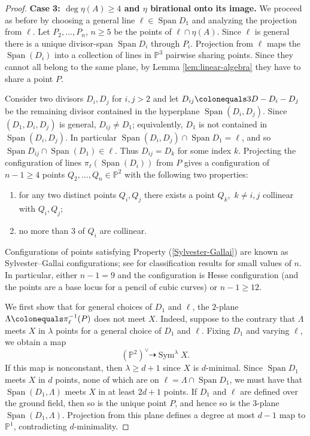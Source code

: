 \documentclass[11pt]{amsart}
\newcommand{\PP}{\mathbb{P}}
\newcommand{\pp}{\mathbb{P}}
\DeclareMathOperator{\Sym}{Sym}
\newcommand{\Span}{\operatorname{Span}}
\theoremstyle{definition}
\theoremstyle{remark}
\begin{document}
\begin{proof}
\noindent
\textbf{\boldmath Case 3: \(\deg \eta(A) \geqslant 4\) and \(\eta\) birational onto its image.} 
We proceed as before by choosing a general line $\ell \in \Span D_1$ and analyzing the projection from $\ell$. 
    Let $P_2, ..., P_n$, $n \geqslant 5$ be the points of $\ell \cap \eta(A)$. Since $\ell$ is general there is a unique divisor-span $\Span D_i$ through $P_i$. Projection from $\ell$ maps the $\Span(D_i)$ into a collection of lines in $\PP^3$ pairwise sharing points.  Since they cannot all belong to the same plane, by Lemma \ref{lem:linear-algebra} they have to share a point $P$. 
        
        Consider two divisors $D_i, D_j$ for $i,j>2$ and let $D_{ij}\colonequals 3D-D_i-D_j$ be the remaining divisor contained in the hyperplane $\Span(D_i, D_j)$.  Since \((D_1, D_i, D_j)\) is general, \(D_{ij} \neq D_1\); equivalently, \(D_1\) is not contained in $\Span(D_i, D_j)$.  In particular \(\Span(D_i, D_j) \cap \Span D_1 = \ell\), and so \(\Span D_{ij}\cap\Span(D_1) \in \ell\).  Thus $D_{ij}=D_k$ for some index $k$.   Projecting the configuration of lines $\pi_\ell(\Span(D_i))$ from $P$ gives a configuration of $n-1 \geqslant 4$ points $Q_2, ..., Q_n \in \PP^2$ with the following two properties:
        \begin{enumerate}
            \item\label{Sylvester-Gallai} for any two distinct points $Q_i, Q_j$ there exists a point $Q_k,$ $k \neq i,j$ collinear with $Q_i, Q_j$;
            \item no more than $3$ of $Q_i$ are collinear.
        \end{enumerate}
        Configurations of points satisfying Property (\ref{Sylvester-Gallai}) are known as Sylvester--Gallai configurations; see \cite[Theorems 3.1 -- 3.6]{kelly1973affine} for classification results for small values of $n$. In particular, either $n-1=9$ and the configuration is  Hesse configuration (and the points are a base locus for a pencil of cubic curves) or $n-1 \geqslant 12.$ 
        

We first show that for general choices of \(D_1\) and \(\ell\), the \(2\)-plane \(\Lambda \colonequals \pi_\ell^{-1}(P)\) does not meet \(X\).  Indeed, suppose to the contrary that \(\Lambda\) meets \(X\) in \(\lambda\) points for a general choice of \(D_1\) and \(\ell\).  Fixing \(D_1\) and varying \(\ell\), we obtain a map
\[(\PP^2)^\vee \dashrightarrow \Sym^\lambda X.\]
If this map is nonconstant, then \(\lambda \geqslant d+1\) since \(X\) is \(d\)-minimal.  Since \(\Span D_1\) meets \(X\) in \(d\) points, none of which are on \(\ell = \Lambda \cap \Span D_1\), we must have that \(\Span(D_1, \Lambda)\) meets \(X\) in at least \(2d + 1\) points.  If \(D_1\) and \(\ell\) are defined over the ground field, then so is the unique point \(P\), and hence so is the \(3\)-plane \(\Span(D_1, \Lambda)\).  Projection from this plane defines a degree at most \(d-1\) map to \(\pp^1\), contradicting \(d\)-minimality.


\end{proof}
\end{document}
